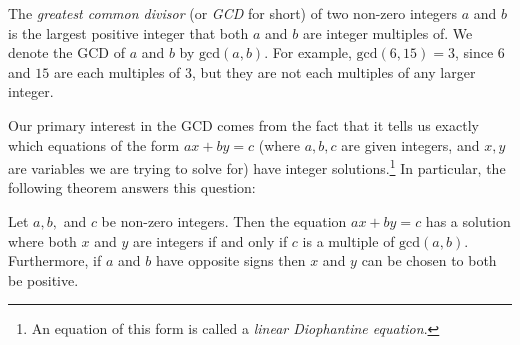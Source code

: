 The \emph{greatest common divisor} (or \emph{GCD} for short) of two non-zero integers $a$ and $b$ is the largest positive integer that both $a$ and $b$ are integer multiples of. We denote the GCD of $a$ and $b$ by $\mathrm{gcd}(a,b)$. For example, $\mathrm{gcd}(6,15) = 3$, since $6$ and $15$ are each multiples of $3$, but they are not each multiples of any larger integer.

Our primary interest in the GCD comes from the fact that it tells us exactly which equations of the form $ax + by = c$ (where $a,b,c$ are given integers, and $x,y$ are variables we are trying to solve for) have integer solutions.\footnote{An equation of this form is called a \emph{linear Diophantine equation}.} In particular, the following theorem answers this question:


\begin{theorem}\label{thm:linear_diophantine}
	Let $a, b,$ and $c$ be non-zero integers. Then the equation $ax + by = c$ has a solution where both $x$ and $y$ are integers if and only if $c$ is a multiple of $\mathrm{gcd}(a,b)$. Furthermore, if $a$ and $b$ have opposite signs then $x$ and $y$ can be chosen to both be positive.
\end{theorem}

